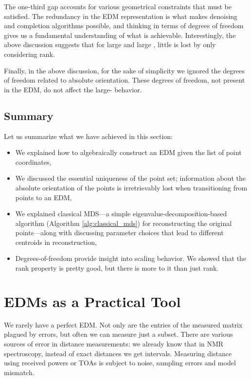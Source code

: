 \documentclass[10pt,double]{IEEEtran}
\newcommand{\rev}[1]{{#1}}
\begin{document}
The one-third gap accounts for various geometrical constraints that must be
satisfied. The redundancy in the EDM representation is what makes denoising
and completion algorithms possible, and thinking in terms of degrees of freedom
gives us a fundamental understanding of what is achievable. Interestingly, the
above discussion suggests that for large  and large , little is
lost by only considering rank.

\rev{Finally, in the above discussion, for the sake of simplicity we ignored the
degrees of freedom related to absolute orientation. These degrees of freedom,
not present in the EDM, do not affect the large- behavior.}

\subsection{Summary}

Let us summarize what we have achieved in this section:
\begin{itemize}
	\item We explained how to algebraically construct an EDM given the list of
	point coordinates,
	\item We discussed the essential uniqueness of the point set; information
	about the absolute orientation of the points is irretrievably lost when
	transitioning from points to an EDM,
  \item We explained classical MDS---a simple eigenvalue-decomposition-based algorithm
  (Algorithm \ref{alg:classical_mds}) for reconstructing the original points---along with discussing parameter choices that lead to different centroids in
  reconstruction,
	\item Degrees-of-freedom provide insight into scaling behavior. We
	showed that the rank property is pretty good, but there is more to it than
	just rank.
\end{itemize}



\section{EDMs as a Practical Tool} \label{sec:edms_as_a_practical_tool}

We rarely have a perfect EDM. Not only are the entries of the measured matrix
plagued by errors, but often we can measure just a subset. There are various
sources of error in distance measurements: we already know that in NMR
spectroscopy, instead of exact distances we get intervals. Measuring distance
using received powers or TOAs is subject to noise, sampling errors and model
mismatch.
\end{document}
